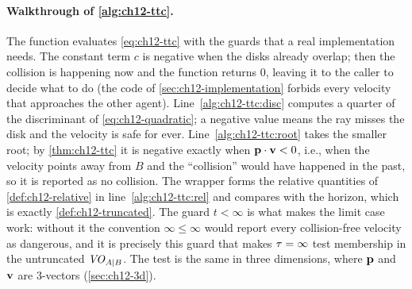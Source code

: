 \paragraph{Walkthrough of \cref{alg:ch12-ttc}.}
The function \VoTimeToCollision evaluates \cref{eq:ch12-ttc} with the guards
that a real implementation needs. The constant term $c$ is negative when the
disks already overlap; then the collision is happening now and the function
returns $0$, leaving it to the caller to decide what to do (the code of
\cref{sec:ch12-implementation} forbids every velocity that approaches the
other agent). Line~\ref{alg:ch12-ttc:disc} computes a quarter of the
discriminant of \cref{eq:ch12-quadratic}; a negative value means the ray misses
the disk and the velocity is safe for ever. Line~\ref{alg:ch12-ttc:root} takes
the smaller root; by \cref{thm:ch12-ttc} it is negative exactly when
$\mathbf{p}\cdot\mathbf{v} < 0$, i.e., when the velocity points away from $B$ and the
``collision'' would have happened in the past, so it is reported as no
collision. The wrapper \VoInside forms the relative quantities of
\cref{def:ch12-relative} in line~\ref{alg:ch12-ttc:rel} and compares with the
horizon, which is exactly \cref{def:ch12-truncated}. The guard $t < \infty$
is what makes the limit case work: without it the convention
$\infty \le \infty$ would report every collision-free velocity as dangerous,
and it is precisely this guard that makes $\tau = \infty$ test membership in
the untruncated $\mathit{VO}_{A|B}$. The test is the same in three
dimensions, where $\mathbf{p}$ and $\mathbf{v}$ are 3-vectors (\cref{sec:ch12-3d}).

\begin{algorithm}[htb]
\caption{Sampled velocity selection for one agent}
\label{alg:ch12-choose}
\end{algorithm}

